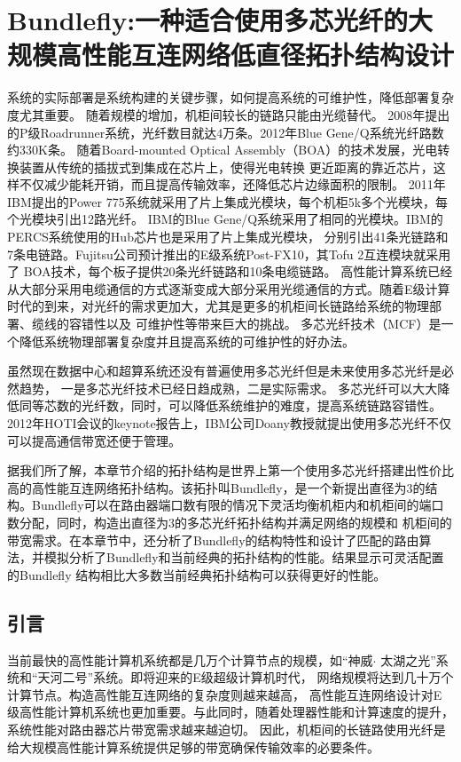 \chapter{Bundlefly:一种适合使用多芯光纤的大规模高性能互连网络低直径拓扑结构设计}
系统的实际部署是系统构建的关键步骤，如何提高系统的可维护性，降低部署复杂度尤其重要。
随着规模的增加，机柜间较长的链路只能由光缆替代。
2008年提出的P级Roadrunner系统，光纤数目就达4万条。2012年Blue Gene/Q系统光纤路数约330K条。
随着Board-mounted Optical Assembly（BOA）的技术发展，光电转换装置从传统的插拔式到集成在芯片上，使得光电转换
更近距离的靠近芯片，这样不仅减少能耗开销，而且提高传输效率，还降低芯片边缘面积的限制。
2011年IBM提出的Power 775系统就采用了片上集成光模块，每个机柜5k多个光模块，每个光模块引出12路光纤。
IBM的Blue Gene/Q系统采用了相同的光模块。IBM的PERCS系统使用的Hub芯片也是采用了片上集成光模块，
分别引出41条光链路和7条电链路。Fujitsu公司预计推出的E级系统Post-FX10，其Tofu 2互连模块就采用了
BOA技术，每个板子提供20条光纤链路和10条电缆链路。
高性能计算系统已经从大部分采用电缆通信的方式逐渐变成大部分采用光缆通信的方式。随着E级计算时代的到来，对光纤的需求更加大，尤其是更多的机柜间长链路给系统的物理部署、缆线的容错性以及
可维护性等带来巨大的挑战。
多芯光纤技术（MCF）是一个降低系统物理部署复杂度并且提高系统的可维护性的好办法。

虽然现在数据中心和超算系统还没有普遍使用多芯光纤但是未来使用多芯光纤是必然趋势，
一是多芯光纤技术已经日趋成熟，二是实际需求。
多芯光纤可以大大降低同等芯数的光纤数，同时，可以降低系统维护的难度，提高系统链路容错性。2012年HOTI会议的keynote报告上，IBM公司Doany教授就提出使用多芯光纤不仅可以提高通信带宽还便于管理。

据我们所了解，本章节介绍的拓扑结构是世界上第一个使用多芯光纤搭建出性价比高的高性能互连网络拓扑结构。该拓扑叫Bundlefly，是一个新提出直径为3的结构。Bundlefly可以在路由器端口数有限的情况下灵活均衡机柜内和机柜间的端口数分配，同时，构造出直径为3的多芯光纤拓扑结构并满足网络的规模和
机柜间的带宽需求。在本章节中，还分析了Bundlefly的结构特性和设计了匹配的路由算法，并模拟分析了Bundlefly和当前经典的拓扑结构的性能。结果显示可灵活配置的Bundlefly 结构相比大多数当前经典拓扑结构可以获得更好的性能。

\section{引言}

当前最快的高性能计算机系统都是几万个计算节点的规模，如“神威$\cdot$ 太湖之光”系统和“天河二号”系统。即将迎来的E级超级计算机时代，
网络规模将达到几十万个计算节点。构造高性能互连网络的复杂度则越来越高，
高性能互连网络设计对E级高性能计算机系统也更加重要。与此同时，随着处理器性能和计算速度的提升，系统性能对路由器芯片带宽需求越来越迫切。
因此，机柜间的长链路使用光纤是给大规模高性能计算系统提供足够的带宽确保传输效率的必要条件。

